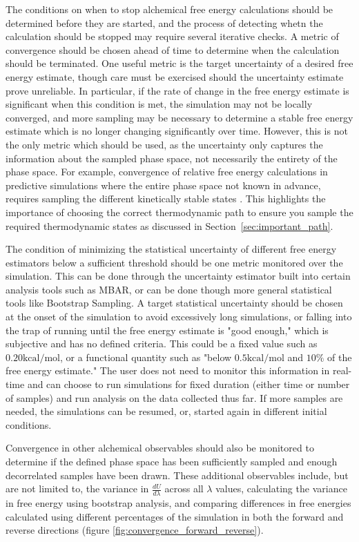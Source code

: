 \documentclass[9pt,bestpractices]{livecoms}
\begin{document}
The conditions on when to stop alchemical free energy calculations should be determined before they are started, and the process of detecting whetn the calculation should be stopped may require several iterative checks. 
A metric of convergence should be chosen ahead of time to determine when the calculation should be terminated.
One useful metric is the target uncertainty of a desired free energy estimate, though care must be exercised should the uncertainty estimate prove unreliable.
In particular, if the rate of change in the free energy estimate is significant when this condition is met, the simulation may not be locally converged, and more sampling may be necessary to determine a stable free energy estimate which is no longer changing significantly over time. 
However, this is not the only metric which should be used, as the uncertainty only captures the information about the sampled phase space, not necessarily the entirety of the phase space.  
For example, 
convergence of relative free energy calculations in predictive simulations where the entire phase space not known in advance, requires sampling the different kinetically stable states . 
This highlights the importance of choosing the correct thermodynamic path to ensure you sample the required thermodynamic states as discussed in Section~\ref{sec:important_path}.

The condition of minimizing the statistical uncertainty of different free energy estimators below a sufficient threshold should be one metric monitored over the simulation. This can be done through the uncertainty estimator built into certain analysis tools such as MBAR, or can be done though more general statistical tools like Bootstrap Sampling. 
A target statistical uncertainty should be chosen at the onset of the simulation to avoid excessively long simulations, or falling into the trap of running until the free energy estimate is "good enough," which is subjective and has no defined criteria. This could be a fixed value such as $0.20 \mathrm{kcal/mol}$, or a functional quantity such as "below $0.5 \mathrm{kcal/mol}$ and $10\%$ of the free energy estimate." The user does not need to monitor this information in real-time and can choose to run simulations for fixed duration (either time or number of samples) and run analysis on the data collected thus far. If more samples are needed, the simulations can be resumed, or, started again in different initial conditions. 

Convergence in other alchemical observables should also be monitored to determine if the defined phase space has been sufficiently sampled and enough decorrelated samples have been drawn. These additional observables include, but are not
limited to, the variance in $\frac{dU}{d\lambda}$ across all $\lambda$ values, calculating the variance in free energy using bootstrap analysis, and comparing differences in free energies calculated using different percentages of the simulation in both the forward and reverse directions (figure \ref{fig:convergence_forward_reverse}).
\end{document}
